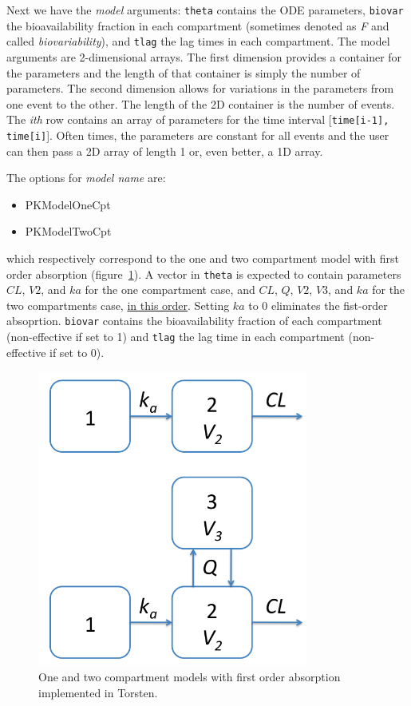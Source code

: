 \documentclass[11pt]{amsart}
\begin{document}
Next we have the \textit{model} arguments: \texttt{theta} contains the ODE parameters, \texttt{biovar} the bioavailability fraction in each compartment (sometimes denoted as \textit{F} and called \textit{biovariability}), and \texttt{tlag} the lag times in each compartment. The model arguments are 2-dimensional arrays. The first dimension provides a container for the parameters and the length of that container is simply the number of parameters. The second dimension allows for variations in the parameters from one event to the other. The length of the 2D container is the number of events. The \textit{ith} row contains an array of parameters for the time interval [\texttt{time[i-1], time[i]}]. Often times, the parameters are constant for all events and the user can then pass a 2D array of length 1 or, even better, a 1D array.

The options for \textit{model name} are:
\begin{itemize}
  \item PKModelOneCpt
  \item PKModelTwoCpt
\end{itemize}
which respectively correspond to the one and two compartment model with first order absorption (figure~\ref{cptModels}). A vector in \texttt{theta} is expected to contain parameters $CL$, $V2$, and $ka$ for the one compartment case, and $CL$, $Q$, $V2$, $V3$, and $ka$ for the two compartments case, \underline{in this order}. Setting $ka$ to 0 eliminates the fist-order absoprtion. \texttt{biovar} contains the bioavailability fraction of each compartment (non-effective if set to 1) and \texttt{tlag} the lag time in each compartment (non-effective if set to 0).

\begin{figure}[htbp]
\includegraphics[width=3.5in,trim=0in 0in 0 0in]{graphics/cptModels.png}
\caption{One and two compartment models with first order absorption implemented in Torsten.}
\label{cptModels}
\end{figure}
\end{document}
